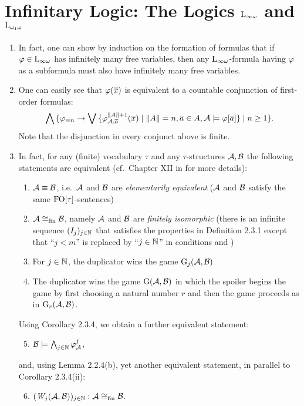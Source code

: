 \section{Infinitary Logic: The Logics $\inflog{\infty}$ and $\inflog{\omega_1}$}
\begin{enumerate}[1.]
%
\item {} In fact, one can show by induction on the formation of formulas that if $\varphi \in \inflog{\infty}$ has infinitely many free variables, then any $\inflog{\infty}$-formula having $\varphi$ as a subformula must also have infinitely many free variables.
%
\item {} One can easily see that $\varphi(\overline{x})$ is equivalent to a countable conjunction of first-order formulas:
\[
\bigwedge {\{\varphi_{= n} \rightarrow\bigvee{\{\varphi^{\|A\| + 1}_{\mathcal{A}, \overline{a}}(\overline{x}) \mid \|A\| = n, \overline{a} \in A, \mathcal{A} \models\varphi[\overline{a}]\}} \mid n \geq 1\}}.
\]
Note that the disjunction in every conjunct above is finite.
%
\item {} In fact, for any (finite) vocabulary $\tau$ and any $\tau$-structures $\mathcal{A}, \mathcal{B}$ the following statements are equivalent (cf.\ Chapter XII in \cite{EFT} for more details):
\begin{enumerate}[(1)]
\item $\strct{A} \equv \strct{B}$, i.e.\ $\mathcal{A}$ and $\mathcal{B}$ are \emph{elementarily equivalent} ($\mathcal{A}$ and $\mathcal{B}$ satisfy the same $\folog\of{\tau}$-sentences)
\item $\strct{A} \isom_\fin \strct{B}$, namely $\mathcal{A}$ and $\mathcal{B}$ are \emph{finitely isomorphic} (there is an infinite sequence $(I_j)_{j \in \mathbb{N}}$ that satisfies the properties  in Definition 2.3.1 except that ``$j < m$'' is replaced by ``$j \in \mathbb{N}$'' in conditions  and )
\item For $j \in \mathbb{N}$, the duplicator wins the game $\game{j}(\strct{A}, \strct{B})$
\item The duplicator wins the game $\mathrm{G}(\mathcal{A}, \mathcal{B})$ in which the spoiler begins the game by first choosing a natural number $r$ and then the game proceeds as in $\game{r}(\strct{A}, \strct{B})$.
\end{enumerate}
Using Corollary 2.3.4, we obtain a further equivalent statement:
\begin{enumerate}[(1)]
\setcounter{enumii}{4}
\item $\mathcal{B} \models \bigwedge_{j \in \mathbb{N}} \varphi^{j}_{\mathcal{A}}$,
\end{enumerate}
and, using Lemma 2.2.4(b), yet another equivalent statement, in parallel to Corollary 2.3.4(ii):
\begin{enumerate}[(1)]
\setcounter{enumii}{5}
\item $\seq{\winpos{j}(\strct{A}, \strct{B})}{j \in \nat} : \strct{A} \isom_\fin \strct{B}$.
\end{enumerate}


\end{enumerate}

